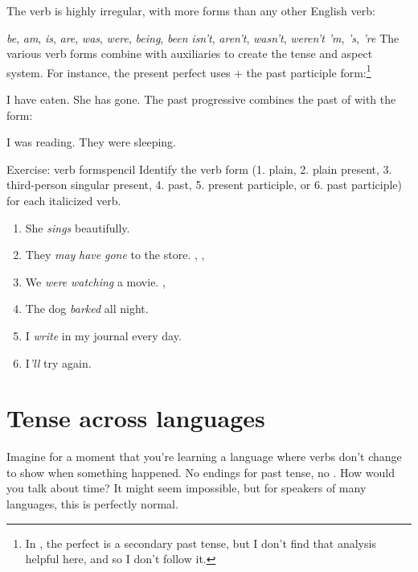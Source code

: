 The verb  is highly irregular, with more forms than any other English verb:

\ea
\ea \emph{be}, \emph{am}, \emph{is}, \emph{are}, \emph{was}, \emph{were}, \emph{being}, \emph{been}
\ex \emph{isn't}, \emph{aren't}, \emph{wasn't}, \emph{weren't}
\ex \emph{'m}, \emph{'s}, \emph{'re}
\z\z
The various verb forms combine with auxiliaries to create the tense and aspect system. For instance, the present perfect uses  + the past participle form:\footnote{In \textcite{Huddleston2002}, the perfect is a secondary past tense, but I don't find that analysis helpful here, and so I don't follow it.}

\ea I have eaten.
\ex She has gone.
\z
The past progressive combines the past of  with the  form:

\ea I was reading.
\ex They were sleeping.
\z{}

\begin{tblsframedsymbol}{Exercise: verb forms}{pencil}
Identify the verb form (1. plain, 2. plain present, 3. third-person singular present, 4. past, 5. present participle, or 6. past participle) for each italicized verb.

\begin{enumerate}[nosep, leftmargin=*]
    \item She \emph{sings} beautifully. \hfill\gap
    \item They \emph{may} \emph{have} \emph{gone} to the store. \hfill\gap,  \gap,  \gap
    \item We \emph{were} \emph{watching} a movie. \hfill\gap,  \gap
    \item The dog \emph{barked} all night. \hfill\gap
    \item I \emph{write} in my journal every day. \hfill\gap
    \item I\emph{'ll} try again. \hfill\gap
\end{enumerate}
\end{tblsframedsymbol}

\section{Tense across languages}

Imagine for a moment that you're learning a language where verbs don't change to show when something happened. No  endings for past tense, no . How would you talk about time? It might seem impossible, but for speakers of many languages, this is perfectly normal.

